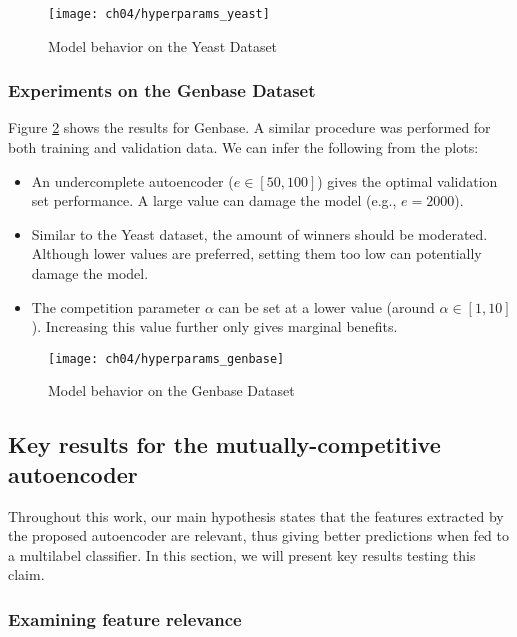 \begin{figure}[!h]
  \centering
  \texttt{[image: ch04/hyperparams\_yeast]}
  \caption{Model behavior on the Yeast Dataset}
  \label{results:mc_char_yeast}
\end{figure}

\subsubsection{Experiments on the Genbase Dataset}

Figure \ref{results:mc_char_genbase} shows the results for Genbase. A similar
procedure was performed for both training and validation data. We can infer
the following from the plots:

\begin{itemize}
  \item An undercomplete autoencoder ($e\in\left[50,100\right]$) gives the
  optimal validation set performance. A large value can damage the model (e.g.,
  $e=2000$).
  \item Similar to the Yeast dataset, the amount of winners should be
  moderated. Although lower values are preferred, setting them too low can
  potentially damage the model.
  \item The competition parameter $\alpha$ can be set at a lower value (around
  $\alpha \in \left[1,10\right]$). Increasing this value further only gives
  marginal benefits.
\end{itemize}

\begin{figure}[!h]
  \centering
  \texttt{[image: ch04/hyperparams\_genbase]}
  \caption{Model behavior on the Genbase Dataset}
  \label{results:mc_char_genbase}
\end{figure}

\subsection{Key results for the mutually-competitive autoencoder}

Throughout this work, our main hypothesis states that the features extracted by
the proposed autoencoder are relevant, thus giving better predictions when
fed to a multilabel classifier. In this section, we will present key results
testing this claim.

\subsubsection{Examining feature relevance}

